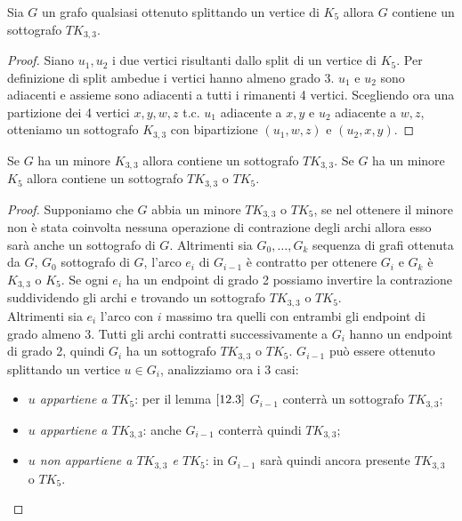 \begin{lemma}\label{12.3}
    Sia \(G\) un grafo qualsiasi ottenuto splittando un vertice di \(K_5\) allora \(G\) contiene un sottografo \(TK_{3,3}\).
    \begin{proof}
        Siano \(u_1, u_2\) i due vertici risultanti dallo split di un vertice di \(K_5\). Per definizione di split ambedue i vertici hanno almeno grado 3. \(u_1\) e \(u_2\) sono adiacenti e assieme sono adiacenti a tutti i rimanenti 4 vertici. Scegliendo ora una partizione dei 4 vertici \(x,y,w,z\) t.c. \(u_1\) adiacente a \(x,y\) e \(u_2\) adiacente a \(w,z\), otteniamo un sottografo \(K_{3,3}\) con bipartizione \((u_1, w, z)\) e \((u_2,x,y)\).
    \end{proof}
\end{lemma}
\begin{teorema}\label{minoreTK5}
    Se \(G\) ha un minore \(K_{3,3}\) allora contiene un sottografo \(TK_{3,3}\). Se \(G\) ha un minore \(K_5\) allora contiene un sottografo \(TK_{3,3}\) o \(TK_5\).
    \begin{proof}
        Supponiamo che \(G\) abbia un minore \(TK_{3,3}\) o \(TK_5\), se nel ottenere il minore non è stata coinvolta nessuna operazione di contrazione degli archi allora esso sarà anche un sottografo di \(G\). Altrimenti sia \(G_0,\dots, G_k\) sequenza di grafi ottenuta da \(G\), \(G_0\) sottografo di \(G\), l'arco \(e_i\) di \(G_{i-1}\) è contratto per ottenere \(G_i\) e \(G_k\) è \(K_{3,3}\) o \(K_5\).
        Se ogni \(e_i\) ha un endpoint di grado 2 possiamo invertire la contrazione suddividendo gli archi e trovando un sottografo \(TK_{3,3}\) o \(TK_5\). 
        \\ Altrimenti sia \(e_i\) l'arco con \(i\) massimo tra quelli con entrambi gli endpoint di grado almeno 3. Tutti gli archi contratti successivamente a \(G_i\) hanno un endpoint di grado 2, quindi \(G_i\) ha un sottografo \(TK_{3,3}\) o \(TK_5\). \(G_{i-1}\) può essere ottenuto splittando un vertice \(u \in G_i\), analizziamo ora i 3 casi:
        \begin{itemize}
            \item \textit{\(u\) appartiene a \(TK_5\)}: per il lemma \(\ref{12.3}\) \(G_{i-1}\) conterrà un sottografo \(TK_{3,3}\);
            \item \textit{\(u\) appartiene a \(TK_{3,3}\)}: anche \(G_{i-1}\) conterrà quindi \(TK_{3,3}\);
            \item \textit{\(u\) non appartiene a \(TK_{3,3}\) e \(TK_5\)}: in \(G_{i-1}\) sarà quindi ancora presente \(TK_{3,3}\) o \(TK_5\).
        \end{itemize}
    \end{proof}
\end{teorema}
